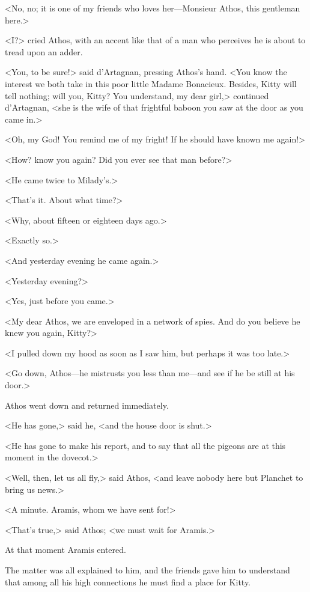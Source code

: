 <No, no; it is one of my friends who loves her---Monsieur Athos, this gentleman here.> 

<I?> cried Athos, with an accent like that of a man who perceives he is about to tread upon an adder. 

<You, to be sure!> said d'Artagnan, pressing Athos's hand. <You know the interest we both take in this poor little Madame Bonacieux. Besides, Kitty will tell nothing; will you, Kitty? You understand, my dear girl,> continued d'Artagnan, <she is the wife of that frightful baboon you saw at the door as you came in.> 

<Oh, my God! You remind me of my fright! If he should have known me again!> 

<How? know you again? Did you ever see that man before?> 

<He came twice to Milady's.> 

<That's it. About what time?> 

<Why, about fifteen or eighteen days ago.> 

<Exactly so.> 

<And yesterday evening he came again.> 

<Yesterday evening?> 

<Yes, just before you came.> 

<My dear Athos, we are enveloped in a network of spies. And do you believe he knew you again, Kitty?> 

<I pulled down my hood as soon as I saw him, but perhaps it was too late.> 

<Go down, Athos---he mistrusts you less than me---and see if he be still at his door.> 

Athos went down and returned immediately. 

<He has gone,> said he, <and the house door is shut.> 

<He has gone to make his report, and to say that all the pigeons are at this moment in the dovecot.> 

<Well, then, let us all fly,> said Athos, <and leave nobody here but Planchet to bring us news.> 

<A minute. Aramis, whom we have sent for!> 

<That's true,> said Athos; <we must wait for Aramis.> 

At that moment Aramis entered. 

The matter was all explained to him, and the friends gave him to understand that among all his high connections he must find a place for Kitty. 

